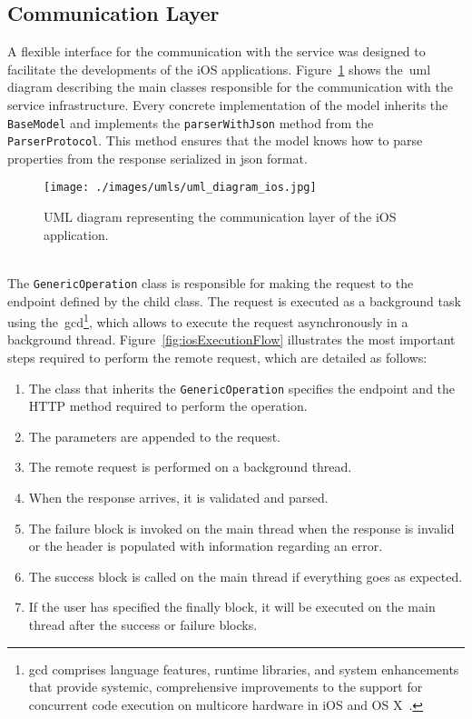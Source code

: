 \subsection{Communication Layer}
\label{subsec:iosCommunicationLayer}
A flexible interface for the communication with the service was designed to facilitate the developments of the iOS applications. Figure~\ref{fig:umliOSServiceLayer} shows the~\gls{uml} diagram describing the main classes responsible for the communication with the service infrastructure. Every concrete implementation of the model inherits the \verb"BaseModel" and implements the \verb"parserWithJson" method from the \verb"ParserProtocol". This method ensures that the model knows how to parse properties from the response serialized in \gls{json} format.
\begin{figure}[h!]
 \centering
   \texttt{[image: ./images/umls/uml\_diagram\_ios.jpg]}
   \caption{UML diagram representing the communication layer of the iOS application.}
   \label{fig:umliOSServiceLayer}
\end{figure}
\\
The \verb"GenericOperation" class is responsible for making the request to the endpoint defined by the child class. The request is executed as a background task using the~\gls{gcd}\footnote{\gls{gcd} comprises language features, runtime libraries, and system enhancements that provide systemic, comprehensive improvements to the support for concurrent code execution on multicore hardware in iOS and OS X~\cite{gcd}.}, which allows to execute the request asynchronously in a background thread. Figure~\ref{fig:iosExecutionFlow} illustrates the most important steps required to perform the remote request, which are detailed as follows:\\
\begin{enumerate}
\item The class that inherits the \verb"GenericOperation" specifies the endpoint and the HTTP method required to perform the operation.
\item The parameters are appended to the request.
\item The remote request is performed on a background thread.
\item When the response arrives, it is validated and parsed.
\item The failure block is invoked on the main thread when the response is invalid or the header is populated with information regarding an error.
\item The success block is called on the main thread if everything goes as expected.
\item If the user has specified the finally block, it will be executed on the main thread after the success or failure blocks.
\end{enumerate}
